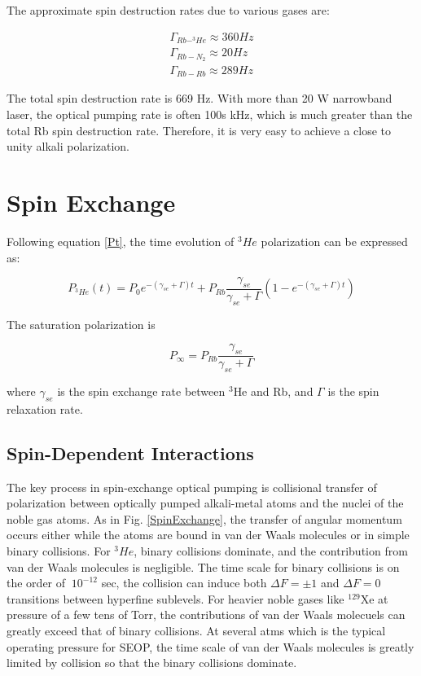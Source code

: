 The approximate spin destruction rates due to various gases are:

\begin{subequations}
	\begin{gather}
	\Gamma_{Rb-^{3}He} \approx 360Hz\\
	\Gamma_{Rb-N_{2}} \approx 20Hz\\
	\Gamma_{Rb-Rb} \approx 289Hz
	\end{gather}
\end{subequations}

The total spin destruction rate is 669 Hz. With more than 20 W narrowband laser, the optical pumping rate is often 100s kHz, which is much greater than the total Rb spin destruction rate. Therefore, it is very easy to achieve a close to unity alkali polarization. 

\section{Spin Exchange}

Following equation \ref{Pt}, the time evolution of $^{3}He$ polarization can be expressed as:

\begin{equation}
P_{^{3}He}(t) = P_{0}e^{-(\gamma_{se}+\Gamma)t} + P_{Rb} \frac{\gamma_{se}}{\gamma_{se}+\Gamma}(1-e^{-(\gamma_{se}+\Gamma)t})
\end{equation}

The saturation polarization is 

\begin{equation}
P_{\infty} = P_{Rb}\frac{\gamma_{se}}{\gamma_{se}+\Gamma}
\end{equation}

where $\gamma_{se}$ is the spin exchange rate between $^{3}$He and Rb, and $\Gamma$ is the spin relaxation rate. 

\subsection{Spin-Dependent Interactions}

The key process in spin-exchange optical pumping is collisional transfer of polarization between optically pumped alkali-metal atoms and the nuclei of the noble gas atoms. As in Fig. \ref{SpinExchange}, the transfer of angular momentum occurs either while the atoms are bound in van der Waals molecules or in simple binary collisions. For $^{3}He$, binary collisions dominate, and the contribution from van der Waals molecules is negligible. The time scale for binary collisions is on the order of $~10^{-12}$ sec, the collision can induce both $\Delta F=\pm1$ and $\Delta F=0$ transitions between hyperfine sublevels. For heavier noble gases like $^{129}$Xe at pressure of a few tens of Torr, the contributions of van der Waals molecuels can greatly exceed that of binary collisions. At several atms which is the typical operating pressure for SEOP, the time scale of van der Waals molecules is greatly limited by collision so that the binary collisions dominate.


